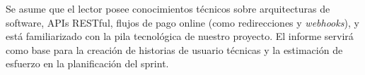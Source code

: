 Se asume que el lector posee conocimientos técnicos sobre arquitecturas de software, APIs RESTful, flujos de pago online (como 
redirecciones y \emph{webhooks}), y está familiarizado con la pila tecnológica de nuestro proyecto. El informe servirá como 
base para la creación de historias de usuario técnicas y la estimación de esfuerzo en la planificación del sprint.\par